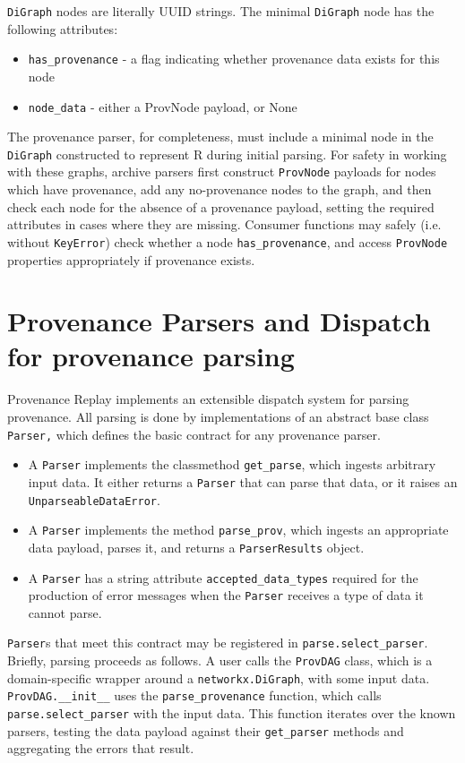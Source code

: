 \texttt{DiGraph} nodes are literally UUID strings. The minimal \texttt{DiGraph} node has the
following attributes:
\begin{itemize}
    \item \texttt{has\_provenance} - a flag indicating whether provenance data exists for this node
    \item \texttt{node\_data} - either a ProvNode payload, or None
\end{itemize}

The provenance parser, for completeness, must include a minimal node in the
\texttt{DiGraph} constructed to represent R during initial parsing. For safety in working
with these graphs, archive parsers first construct \texttt{ProvNode} payloads for nodes
which have provenance, add any no-provenance nodes to the graph, and then check
each node for the absence of a provenance payload, setting the required
attributes in cases where they are missing. Consumer functions may safely
(i.e. without \texttt{KeyError}) check whether a node \texttt{has\_provenance},
and access \texttt{ProvNode} properties appropriately if provenance exists.

\section{Provenance Parsers and Dispatch for provenance parsing}

Provenance Replay implements an extensible dispatch system for parsing
provenance. All parsing is done by implementations of an abstract base class
\texttt{Parser,} which defines the basic contract for any provenance parser. 
\begin{itemize}
    \item A \texttt{Parser} implements the classmethod \texttt{get\_parse},
        which ingests arbitrary input data. It either returns a \texttt{Parser} that
        can parse that data, or it raises an \texttt{UnparseableDataError}.
    \item A \texttt{Parser} implements the method \texttt{parse\_prov}, which
        ingests an appropriate data payload, parses it, and returns a
        \texttt{ParserResults} object.
    \item A \texttt{Parser} has a string attribute \texttt{accepted\_data\_types}
        required for the production of error messages when the \texttt{Parser}
        receives a type of data it cannot parse.
\end{itemize}

\texttt{Parser}s that meet this contract may be registered in \texttt{parse.select\_parser}.
Briefly, parsing proceeds as follows. A user calls the \texttt{ProvDAG} class, which is a
domain-specific wrapper around a \texttt{networkx.DiGraph}, with some input data.
\texttt{ProvDAG.\_\_init\_\_} uses the \texttt{parse\_provenance} function, which calls
\texttt{parse.select\_parser} with the input data. This function iterates over the known
parsers, testing the data payload against their \texttt{get\_parser} methods and
aggregating the errors that result. 

